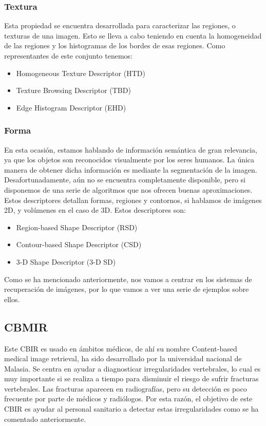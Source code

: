 \subsubsection{Textura}

Esta propiedad se encuentra desarrollada para caracterizar las regiones, o texturas de una imagen. Esto se lleva a cabo teniendo en cuenta la homogeneidad de las regiones y los histogramas de los bordes de esas regiones. Como representantes de este conjunto tenemos:

\begin{itemize}
\item Homogeneous Texture Descriptor (HTD)
\item Texture Browsing Descriptor (TBD)
\item Edge Histogram Descriptor (EHD)
\end{itemize}

\subsubsection{Forma}

En esta ocasión, estamos hablando de información semántica de gran relevancia, ya que los objetos son reconocidos visualmente por los seres humanos. La única manera de obtener dicha información es mediante la segmentación de la imagen. Desafortunadamente, aún no se encuentra completamente disponible, pero si disponemos de una serie de algoritmos que nos ofrecen buenas aproximaciones. Estos descriptores detallan formas, regiones y contornos, si hablamos de imágenes 2D, y volúmenes en el caso de 3D. Estos descriptores son:

\begin{itemize}
\item Region-based Shape Descriptor (RSD)
\item Contour-based Shape Descriptor (CSD)
\item 3-D Shape Descriptor (3-D SD)
\end{itemize}

 
Como se ha mencionado anteriormente, nos vamos a centrar en los sistemas de recuperación de imágenes, por lo que vamos a ver una serie de ejemplos sobre ellos.

\subsection{CBMIR}

Este CBIR es usado en ámbitos médicos, de ahí su nombre Content-based medical image retrieval, ha sido desarrollado por la universidad nacional de Malasia. Se centra en ayudar a diagnosticar irregularidades vertebrales, lo cual es muy importante si se realiza a tiempo para disminuir el riesgo de sufrir fracturas vertebrales. Las fracturas aparecen en radiografías, pero su detección es poco frecuente por parte de médicos y radiólogos. Por esta razón, el objetivo de este CBIR es ayudar al personal sanitario a detectar estas irregularidades como se ha comentado anteriormente.\\

